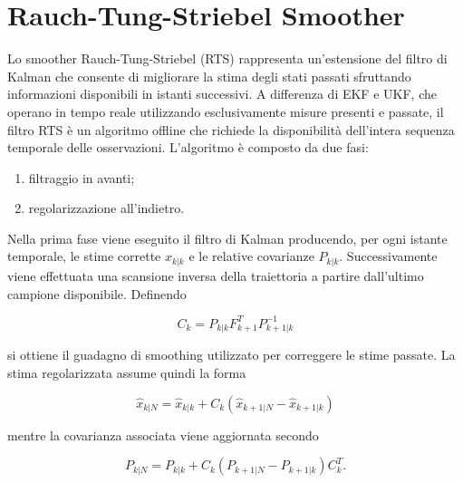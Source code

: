 \documentclass[12pt,a4paper]{article}
\begin{document}
\section{Rauch-Tung-Striebel Smoother}
Lo smoother Rauch-Tung-Striebel (RTS) rappresenta un'estensione del filtro di Kalman che consente di migliorare la stima degli stati passati sfruttando informazioni disponibili in istanti successivi.
A differenza di EKF e UKF, che operano in tempo reale utilizzando esclusivamente misure presenti e passate, il filtro RTS è un algoritmo offline che richiede la disponibilità dell'intera sequenza temporale delle osservazioni.
L'algoritmo è composto da due fasi:
\begin{enumerate}
\item filtraggio in avanti;
\item regolarizzazione all'indietro.
\end{enumerate}
Nella prima fase viene eseguito il filtro di Kalman producendo, per ogni istante temporale, le stime corrette $\hat{x}_{k|k}$ e le relative covarianze $P_{k|k}$.
Successivamente viene effettuata una scansione inversa della traiettoria a partire dall'ultimo campione disponibile.
Definendo

\begin{equation}
C_k = P_{k|k} F_{k+1}^{T} P_{k+1|k}^{-1}
\end{equation}

si ottiene il guadagno di smoothing utilizzato per correggere le stime passate.
La stima regolarizzata assume quindi la forma

\begin{equation}
\hat{x}_{k|N} = \hat{x}_{k|k} + C_k \left( \hat{x}_{k+1|N} - \hat{x}_{k+1|k} \right)
\end{equation}

mentre la covarianza associata viene aggiornata secondo

\begin{equation}
P_{k|N} = P_{k|k} + C_k \left( P_{k+1|N} - P_{k+1|k} \right) C_k^T.
\end{equation}
\end{document}
